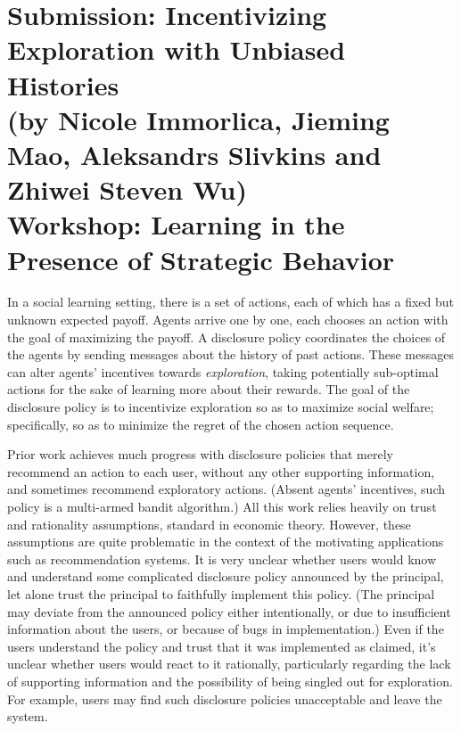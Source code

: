 \documentclass[11pt,letterpaper]{article}
\begin{document}

\section*{Submission: Incentivizing Exploration with Unbiased Histories \\
{\large (by Nicole Immorlica, Jieming Mao, Aleksandrs Slivkins and Zhiwei Steven Wu)}\\
{\large Workshop: Learning in the Presence of Strategic Behavior}
}


In a social learning setting, there is a set of actions, each of which has a fixed but unknown expected payoff. Agents arrive one by one, each chooses an action with the goal of maximizing the payoff.  A disclosure policy coordinates the choices of the agents by sending messages about the history of past actions. These messages can alter agents' incentives towards \emph{exploration}, taking potentially sub-optimal actions for the sake of learning more about their rewards. The goal of the disclosure policy is to incentivize exploration so as  to maximize social welfare; specifically, so as to minimize the regret of the chosen action sequence.

Prior work achieves much progress with disclosure policies that merely recommend an action to each user, without any other supporting information, and sometimes recommend exploratory actions. (Absent agents' incentives, such policy is a multi-armed bandit algorithm.) All this work relies heavily on trust and rationality assumptions, standard in economic theory. However, these assumptions are quite problematic in the context of the motivating applications such as recommendation systems. It is very unclear whether users would know and understand some complicated disclosure policy announced  by the principal, let alone trust the principal to faithfully implement this policy. (The principal may deviate from the announced policy either intentionally, or due to insufficient information about the users, or because of bugs in implementation.) Even if the users understand the policy and trust that it was implemented as claimed, it's unclear whether users would react to it rationally, particularly regarding the lack of supporting information and the possibility of being singled out for exploration. For example, users may find such disclosure policies unacceptable and leave the system.
\end{document}
